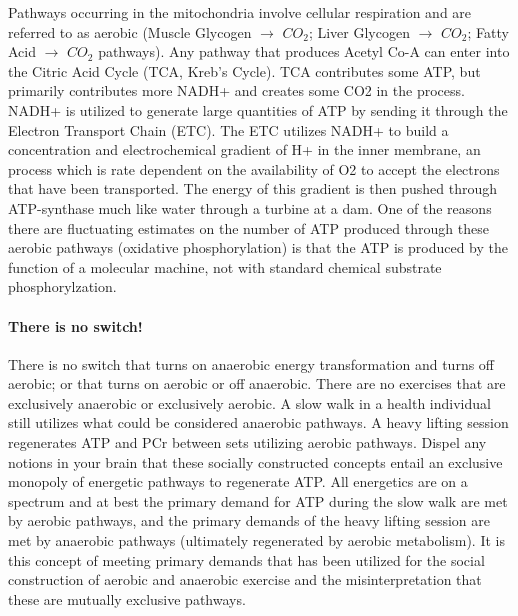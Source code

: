 Pathways occurring in the mitochondria involve cellular respiration and are referred to as aerobic (Muscle Glycogen $\rightarrow$ $CO_2$; Liver Glycogen $\rightarrow$ $CO_2$; Fatty Acid $\rightarrow$ $CO_2$ pathways). Any pathway that produces Acetyl Co-A can enter into the Citric Acid Cycle (TCA, Kreb's Cycle). TCA contributes some ATP, but primarily contributes more NADH+ and creates some CO2 in the process. NADH+ is utilized to generate large quantities of ATP by sending it through the Electron Transport Chain (ETC). The ETC utilizes NADH+ to build a concentration and electrochemical gradient of H+ in the inner membrane, an process which is rate dependent on the availability of O2 to accept the electrons that have been transported. The energy of this gradient is then pushed through ATP-synthase much like water through a turbine at a dam. One of the reasons there are fluctuating estimates on the number of ATP produced through these aerobic pathways (oxidative phosphorylation) is that the ATP is produced by the function of a molecular machine, not with standard chemical substrate phosphorylzation. 


\paragraph{There is no switch!}
There is no switch that turns on anaerobic energy transformation and turns off aerobic; or that turns on aerobic or off anaerobic. There are no exercises that are exclusively anaerobic or exclusively aerobic. A slow walk in a health individual still utilizes what could be considered anaerobic pathways. A heavy lifting session regenerates ATP and PCr between sets utilizing aerobic pathways. Dispel any notions in your brain that these socially constructed concepts entail an exclusive monopoly of energetic pathways to regenerate ATP. All energetics are on a spectrum and at best the primary demand for ATP during the slow walk are met by aerobic pathways, and the primary demands of the heavy lifting session are met by anaerobic pathways (ultimately regenerated by aerobic metabolism). It is this concept of meeting primary demands that has been utilized for the social construction of aerobic and anaerobic exercise and the misinterpretation that these are mutually exclusive pathways.

